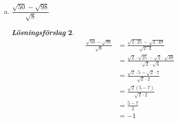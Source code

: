\documentclass[a4paper]{article}
\newtheorem*{sol}{\normalfont\textit{Lösningsförslag}}
\begin{document}
\begin{enumerate}[(a)]
\begin{sol}
  \end{sol}
\item $\dfrac{\sqrt{50} - \sqrt{98}}{\sqrt{8}}$
  \begin{sol}
    \begin{align*}
      \frac{\sqrt{50} - \sqrt{98}}{\sqrt{8}} 
      &= \frac{\sqrt{2\cdot 25} - \sqrt{2\cdot 49}}{\sqrt{2\cdot 4}} \\[1em]
      &= \frac{\sqrt{2}\cdot \sqrt{25} - \sqrt{2}\cdot \sqrt{49}}{\sqrt{2}\cdot \sqrt{4}} \\[1em]
      &= \frac{\sqrt{2}\cdot 5 - \sqrt{2}\cdot 7}{\sqrt{2}\cdot 2} \\[1em]
      &= \frac{\sqrt{2}(5-7)}{\sqrt{2}\cdot 2} \\[1em]
      &= \frac{5-7}{2} \\[1em]
      &= -1
    \end{align*}
  \end{sol}
\end{enumerate}
\end{document}
